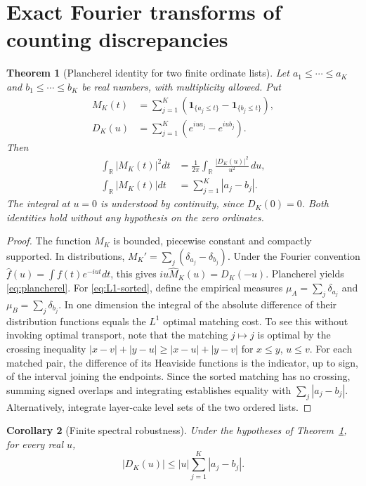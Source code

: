 \documentclass[11pt,leqno]{amsart}
\numberwithin{equation}{section}
\newtheorem{theorem}{Theorem}[section]
\newtheorem{corollary}[theorem]{Corollary}
\theoremstyle{definition}
\theoremstyle{remark}
\newcommand{\R}{\mathbb R}
\newcommand{\1}{\mathbf 1}
\begin{document}
\section{Exact Fourier transforms of counting discrepancies}\label{sec:spectral}
\begin{theorem}[Plancherel identity for two finite ordinate lists]\label{thm:plancherel}
Let $a_1\le\cdots\le a_K$ and $b_1\le\cdots\le b_K$ be real numbers, with multiplicity allowed. Put
\begin{align}
 M_K(t)&=\sum_{j=1}^K(\1_{\{a_j\le t\}}-\1_{\{b_j\le t\}}),\label{eq:M-count}\\
 D_K(u)&=\sum_{j=1}^K(e^{iua_j}-e^{iub_j}).\label{eq:D-spectral}
\end{align}
Then
\begin{align}
 \int_\R|M_K(t)|^2dt&=\frac1{2\pi}\int_\R\frac{|D_K(u)|^2}{u^2}\,du,\label{eq:plancherel}\\
 \int_\R|M_K(t)|dt&=\sum_{j=1}^K|a_j-b_j|.\label{eq:L1-sorted}
\end{align}
The integral at $u=0$ is understood by continuity, since $D_K(0)=0$. Both identities hold without any hypothesis on the zero ordinates.
\end{theorem}
\begin{proof}
The function $M_K$ is bounded, piecewise constant and compactly supported. In distributions, $M_K'=\sum_j(\delta_{a_j}-\delta_{b_j})$. Under the Fourier convention $\widehat f(u)=\int f(t)e^{-iut}dt$, this gives $iu\widehat M_K(u)=D_K(-u)$. Plancherel yields \eqref{eq:plancherel}.
For \eqref{eq:L1-sorted}, define the empirical measures $\mu_A=\sum_j\delta_{a_j}$ and $\mu_B=\sum_j\delta_{b_j}$. In one dimension the integral of the absolute difference of their distribution functions equals the $L^1$ optimal matching cost. To see this without invoking optimal transport, note that the matching $j\mapsto j$ is optimal by the crossing inequality $|x-v|+|y-u|\ge |x-u|+|y-v|$ for $x\le y$, $u\le v$. For each matched pair, the difference of its Heaviside functions is the indicator, up to sign, of the interval joining the endpoints. Since the sorted matching has no crossing, summing signed overlaps and integrating establishes equality with $\sum_j|a_j-b_j|$. Alternatively, integrate layer-cake level sets of the two ordered lists.
\end{proof}
\begin{corollary}[Finite spectral robustness]\label{cor:finite-spectrum}
Under the hypotheses of Theorem~\ref{thm:plancherel}, for every real $u$,
\begin{equation}\label{eq:pointwise-spectrum}
 |D_K(u)|\le |u|\sum_{j=1}^K|a_j-b_j|.
\end{equation}
\end{corollary}
\end{document}
